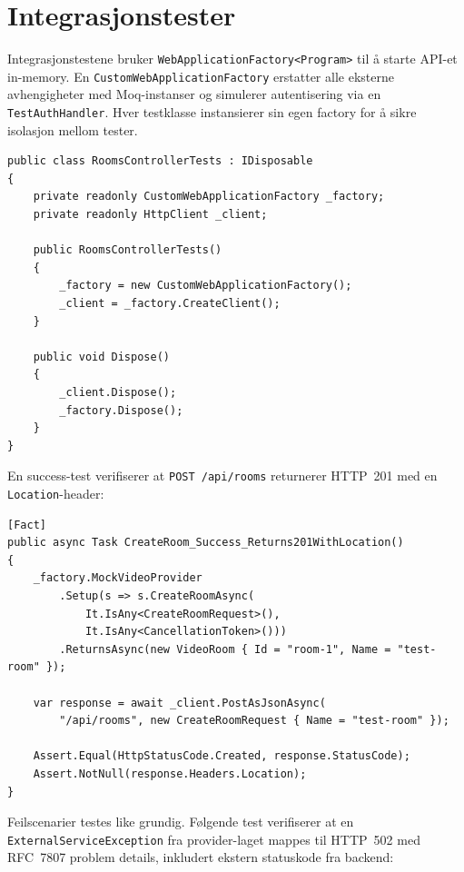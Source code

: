 \section{Integrasjonstester}
\label{sec:integrasjonstester}

Integrasjonstestene bruker \texttt{WebApplicationFactory<Program>} 
til å starte API-et in-memory. En \texttt{CustomWebApplicationFactory} 
erstatter alle eksterne avhengigheter med Moq-instanser og 
simulerer autentisering via en \texttt{TestAuthHandler}. 
Hver testklasse instansierer sin egen factory for å sikre 
isolasjon mellom tester.

\begin{lstlisting}[language={[Sharp]C}, caption={RoomsControllerTests — oppsett med per-test isolasjon}]
public class RoomsControllerTests : IDisposable
{
    private readonly CustomWebApplicationFactory _factory;
    private readonly HttpClient _client;

    public RoomsControllerTests()
    {
        _factory = new CustomWebApplicationFactory();
        _client = _factory.CreateClient();
    }

    public void Dispose()
    {
        _client.Dispose();
        _factory.Dispose();
    }
}
\end{lstlisting}

En success-test verifiserer at \texttt{POST /api/rooms} 
returnerer HTTP~201 med en \texttt{Location}-header:

\begin{lstlisting}[language={[Sharp]C}, caption={RoomsControllerTests — CreateRoom success}]
[Fact]
public async Task CreateRoom_Success_Returns201WithLocation()
{
    _factory.MockVideoProvider
        .Setup(s => s.CreateRoomAsync(
            It.IsAny<CreateRoomRequest>(),
            It.IsAny<CancellationToken>()))
        .ReturnsAsync(new VideoRoom { Id = "room-1", Name = "test-room" });

    var response = await _client.PostAsJsonAsync(
        "/api/rooms", new CreateRoomRequest { Name = "test-room" });

    Assert.Equal(HttpStatusCode.Created, response.StatusCode);
    Assert.NotNull(response.Headers.Location);
}
\end{lstlisting}

Feilscenarier testes like grundig. Følgende test verifiserer 
at en \texttt{ExternalServiceException} fra provider-laget 
mappes til HTTP~502 med RFC~7807 problem details, inkludert 
ekstern statuskode fra backend:

